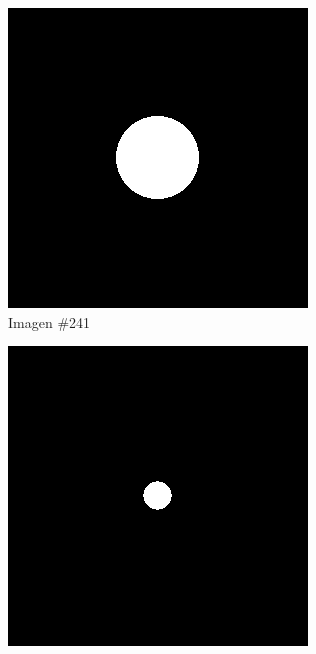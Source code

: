 \begin{figure}
	\begin{subfigure}{0.30\textwidth}
		\centering
		\includegraphics[width=\textwidth]{images/datasets/ImSphRad100/Sphere241.png}
		\caption{Imagen \#241}
		\label{f:implementacion:ImSphRad100:241}
	\end{subfigure}
	\begin{subfigure}{0.30\textwidth}
		\centering
		\includegraphics[width=\textwidth]{images/datasets/ImSphRad100/Sphere249.png}

\end{subfigure}
\end{figure}
